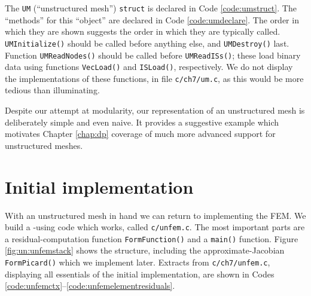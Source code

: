 The \texttt{UM} (``unstructured mesh'') \texttt{struct} is declared in Code \ref{code:umstruct}.  The ``methods'' for this ``object'' are declared in Code \ref{code:umdeclare}.  The order in which they are shown suggests the order in which they are typically called.  \texttt{UMInitialize()} should be called before anything else, and \texttt{UMDestroy()} last.  Function \texttt{UMReadNodes()} should be called before \texttt{UMReadISs()}; these load binary data using \PETSc functions  \texttt{VecLoad()} and \texttt{ISLoad()}, respectively.
We do not display the implementations of these functions, in file \texttt{c/ch7/um.c}, as this would be more tedious than illuminating.

Despite our attempt at modularity, our representation of an unstructured mesh is deliberately simple and even naive.  It provides a suggestive example which motivates Chapter \ref{chap:dp} coverage of much more advanced \PETSc support for unstructured meshes.



\section{Initial implementation}

With an unstructured mesh in hand we can return to implementing the FEM.  We build a \pSNES-using code which works, called \texttt{c/\CODELOC unfem.c}.  The most important parts are a residual-computation function \texttt{FormFunction()} and a \texttt{main()} function.  Figure \ref{fig:un:unfemstack} shows the structure, including the approximate-Jacobian \texttt{FormPicard()} which we implement later.  Extracts from \texttt{c/ch7/unfem.c}, displaying all essentials of the initial implementation, are shown in Codes \ref{code:unfemctx}--\ref{code:unfemelementresiduals}.

